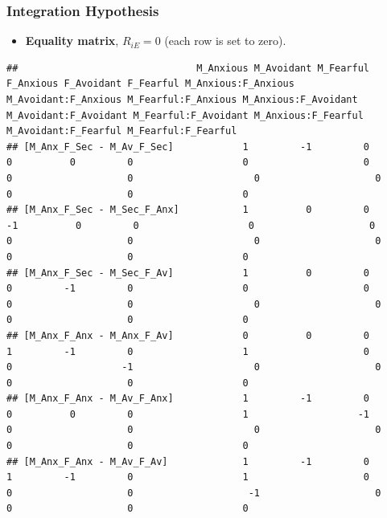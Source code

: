 \documentclass[
]{book}
\providecommand{\tightlist}{%
  \setlength{\itemsep}{0pt}\setlength{\parskip}{0pt}}
\begin{document}
\hypertarget{integration-hypothesis}{%
\subsubsection*{Integration Hypothesis}\label{integration-hypothesis}}

\begin{itemize}
\tightlist
\item
  \textbf{Equality matrix}, \(R_{iE} = 0\) (each row is set to zero).
\end{itemize}

\begin{verbatim}
##                               M_Anxious M_Avoidant M_Fearful F_Anxious F_Avoidant F_Fearful M_Anxious:F_Anxious M_Avoidant:F_Anxious M_Fearful:F_Anxious M_Anxious:F_Avoidant M_Avoidant:F_Avoidant M_Fearful:F_Avoidant M_Anxious:F_Fearful M_Avoidant:F_Fearful M_Fearful:F_Fearful
## [M_Anx_F_Sec - M_Av_F_Sec]            1         -1         0         0          0         0                   0                    0                   0                    0                     0                    0                   0                    0                   0
## [M_Anx_F_Sec - M_Sec_F_Anx]           1          0         0        -1          0         0                   0                    0                   0                    0                     0                    0                   0                    0                   0
## [M_Anx_F_Sec - M_Sec_F_Av]            1          0         0         0         -1         0                   0                    0                   0                    0                     0                    0                   0                    0                   0
## [M_Anx_F_Anx - M_Anx_F_Av]            0          0         0         1         -1         0                   1                    0                   0                   -1                     0                    0                   0                    0                   0
## [M_Anx_F_Anx - M_Av_F_Anx]            1         -1         0         0          0         0                   1                   -1                   0                    0                     0                    0                   0                    0                   0
## [M_Anx_F_Anx - M_Av_F_Av]             1         -1         0         1         -1         0                   1                    0                   0                    0                    -1                    0                   0                    0                   0

\end{verbatim}
\end{document}
